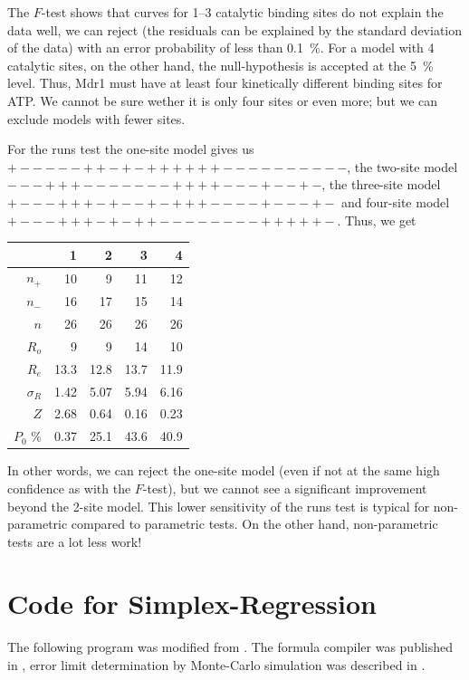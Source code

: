 \begin{refsection}
The \(F\)-test shows that curves for 1--3 catalytic binding sites do not explain the data well, we can reject  (the residuals can be explained by the standard deviation of the data) with an error probability of less than \SI{0.1}{\%}. For a model with 4 catalytic sites, on the other hand, the null-hypothesis is accepted at the \SI{5}{\%} level. Thus, Mdr1 must have at least four kinetically different binding sites for ATP. We cannot be sure wether it is only four sites or even more; but we can exclude models with fewer sites.

For the runs test the one-site model gives us \(+-----++-+-++++++----------\), the two-site model  \(---+++-------++++---+--+-\), the three-site model  \(+---+++-+--+-+++----+---+-\) and four-site model \(+---+++-+-++--------+++++-\). Thus, we get

\begin{tabular}{rrrrr}
  \toprule
                &  1    &  2    &  3    &   4    \\
  \midrule
  \(n_+\)       & 10    &  9    & 11    &  12    \\
  \(n_-\)       & 16    & 17    & 15    &  14    \\
  \(n\)         & 26    & 26    & 26    &  26    \\
  \(R_o\)       &  9    &  9    & 14    &  10    \\
  \(R_e\)       & 13.3  & 12.8  & 13.7  &  11.9  \\
  \(\sigma_R\)  &  1.42 &  5.07 &  5.94 &   6.16 \\
  \(Z\)         &  2.68 &  0.64 &  0.16 &   0.23 \\
  \bottomrule
  \(P_0\) \si{\%}& 0.37 & 25.1  & 43.6  &  40.9  \\
  \bottomrule
\end{tabular}

In other words, we can reject the one-site model (even if not at the same high confidence as with the \(F\)-test), but we cannot see a significant improvement beyond the 2-site model. This lower sensitivity of the runs test is typical for non-parametric compared to parametric tests. On the other hand, non-parametric tests are a lot less work!

\section{Code for Simplex-Regression}

The following program was modified from \parencite{Nel-65,Cac-84}. The formula compiler was published in \parencite{Gie-87b}, error limit determination by Monte-Carlo simulation was described in \parencite{Str-92}.


\end{refsection}
